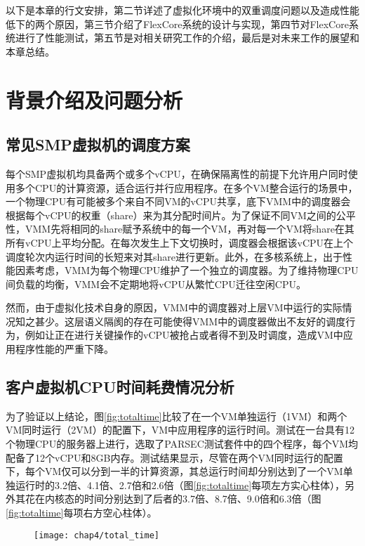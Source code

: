 以下是本章的行文安排，第二节详述了虚拟化环境中的双重调度问题以及造成性能低下的两个原因，第三节介绍了FlexCore系统的设计与实现，第四节对FlexCore系统进行了性能测试，第五节是对相关研究工作的介绍，最后是对未来工作的展望和本章总结。



\section{背景介绍及问题分析}

\subsection{常见SMP虚拟机的调度方案}

每个SMP虚拟机均具备两个或多个vCPU，在确保隔离性的前提下允许用户同时使用多个CPU的计算资源，适合运行并行应用程序。在多个VM整合运行的场景中，一个物理CPU有可能被多个来自不同VM的vCPU共享，底下VMM中的调度器会根据每个vCPU的权重（share）来为其分配时间片。为了保证不同VM之间的公平性，VMM先将相同的share赋予系统中的每一个VM，再对每一个VM将share在其所有vCPU上平均分配。在每次发生上下文切换时，调度器会根据该vCPU在上个调度轮次内运行时间的长短来对其share进行更新。此外，在多核系统上，出于性能因素考虑，VMM为每个物理CPU维护了一个独立的调度器。为了维持物理CPU间负载的均衡，VMM会不定期地将vCPU从繁忙CPU迁往空闲CPU。

然而，由于虚拟化技术自身的原因，VMM中的调度器对上层VM中运行的实际情况知之甚少。这层语义隔阂的存在可能使得VMM中的调度器做出不友好的调度行为，例如让正在进行关键操作的vCPU被抢占或者得不到及时调度，造成VM中应用程序性能的严重下降。

\subsection{客户虚拟机CPU时间耗费情况分析}

为了验证以上结论，图\ref{fig:totaltime}比较了在一个VM单独运行（1VM）和两个VM同时运行（2VM）的配置下，VM中应用程序的运行时间。测试在一台具有12个物理CPU的服务器上进行，选取了PARSEC测试套件中的四个程序，每个VM均配备了12个vCPU和8GB内存。测试结果显示，尽管在两个VM同时运行的配置下，每个VM仅可以分到一半的计算资源，其总运行时间却分别达到了一个VM单独运行时的3.2倍、4.1倍、2.7倍和2.6倍（图\ref{fig:totaltime}每项左方实心柱体），另外其花在内核态的时间分别达到了后者的3.7倍、8.7倍、9.0倍和6.3倍（图\ref{fig:totaltime}每项右方空心柱体）。

\begin{figure}[!htp]
  \centering
  \texttt{[image: chap4/total\_time]}
\end{figure}

